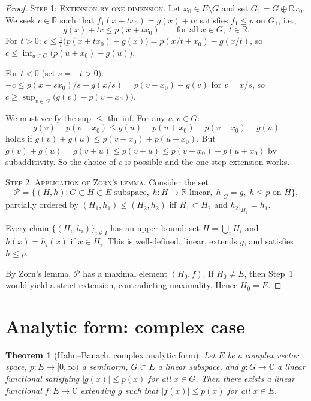 \documentclass[a4paper,12pt]{book}
\newcommand{\R}{\mathbb{R}}
\newcommand{\C}{\mathbb{C}}
\newcommand{\abs}[1]{\left| #1 \right|}
\theoremstyle{definition}
\theoremstyle{plain}
\newtheorem{theorem}[definition]{Theorem}
\theoremstyle{remark}
\begin{document}
\begin{proof}
\textsc{Step 1: Extension by one dimension.}
Let $x_0\in E\setminus G$ and set $G_1 = G\oplus\R x_0$. We seek $c\in\R$ such
that $f_1(x+tx_0)=g(x)+tc$ satisfies $f_1\leq p$ on $G_1$, i.e.,
\[
  g(x)+tc \leq p(x+tx_0) \qquad\text{for all } x\in G,\; t\in\R.
\]
For $t>0$: $c\leq \frac{1}{t}\bigl(p(x+tx_0)-g(x)\bigr) = p(x/t+x_0)-g(x/t)$,
so $c\leq\inf_{u\in G}\bigl(p(u+x_0)-g(u)\bigr)$.

For $t<0$ (set $s=-t>0$): $-c\leq p(x-sx_0)/s-g(x/s) = p(v-x_0)-g(v)$ for
$v=x/s$, so $c\geq\sup_{v\in G}\bigl(g(v)-p(v-x_0)\bigr)$.

We must verify the sup $\leq$ the inf. For any $u,v\in G$:
\[
  g(v)-p(v-x_0) \leq g(u)+p(u+x_0)-p(v-x_0)-g(u)
\]
holds if $g(v)+g(u) \leq p(v-x_0)+p(u+x_0)$. But $g(v)+g(u) = g(v+u)
\leq p(v+u) \leq p(v-x_0)+p(u+x_0)$ by subadditivity. So the choice of $c$ is
possible and the one-step extension works.

\textsc{Step 2: Application of Zorn's lemma.}
Consider the set
\[
  \mathcal{P} = \bigl\{(H,h) : G\subset H\subset E \text{ subspace},\;
  h\colon H\to\R \text{ linear},\; h|_G=g,\; h\leq p\text{ on }H\bigr\},
\]
partially ordered by $(H_1,h_1)\leq(H_2,h_2)$ iff $H_1\subset H_2$ and
$h_2|_{H_1}=h_1$.

Every chain $\{(H_i,h_i)\}_{i\in I}$ has an upper bound: set
$H=\bigcup_i H_i$ and $h(x)=h_i(x)$ if $x\in H_i$. This is well-defined,
linear, extends $g$, and satisfies $h\leq p$.

By Zorn's lemma, $\mathcal{P}$ has a maximal element $(H_0,f)$.
If $H_0\neq E$, then Step~1 would yield a strict extension, contradicting
maximality. Hence $H_0=E$.
\end{proof}

\section{Analytic form: complex case}

\begin{theorem}[Hahn--Banach, complex analytic form]\label{thm:HB-complex}
Let $E$ be a complex vector space, $p\colon E\to[0,\infty)$ a seminorm, $G\subset E$
a linear subspace, and $g\colon G\to\C$ a linear functional satisfying
$\abs{g(x)}\leq p(x)$ for all $x\in G$. Then there exists a linear functional
$f\colon E\to\C$ extending $g$ such that $\abs{f(x)}\leq p(x)$ for all $x\in E$.
\end{theorem}
\end{document}
